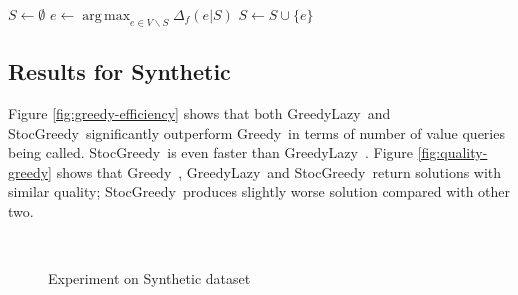 \documentclass[11pt]{article}
\newcommand{\greedy}{{\sc Greedy}~}
\newcommand{\greedyLazy}{{\sc GreedyLazy}~}
\newcommand{\stocGreedy}{{\sc StocGreedy}~}
\DeclareMathOperator*{\argmax}{arg\,max}
\begin{document}
\begin{algorithm}[H]
\DontPrintSemicolon %
$S \gets \emptyset$\;
 {
  $e \gets \argmax_{e\in V\backslash S} \Delta_f(e|S)$\;\label{line:emax}
  $S \gets S\cup \{e\}$\;
}
\;
\caption{\greedy for submodular maximization subject to cardinality constraint}
\label{algo:greedy}
\end{algorithm}

\subsection{Results for {\sc Synthetic}}
Figure \ref{fig:greedy-efficiency} shows that both \greedyLazy and \stocGreedy significantly outperform \greedy in terms of number of value queries being called. \stocGreedy is even faster than \greedyLazy.  Figure \ref{fig:quality-greedy} shows that \greedy, \greedyLazy and \stocGreedy return solutions with similar quality; \stocGreedy produces slightly worse solution compared with other two.

\begin{figure*}[h!t]
     \centering
     ~~
     \caption{Experiment on {\sc Synthetic} dataset}
     \label{fig:sythetic-offline}
\end{figure*}



\end{document}
